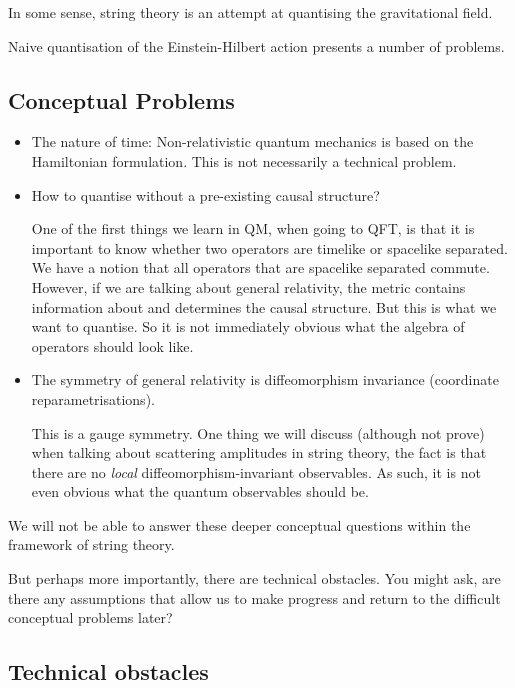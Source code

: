 In some sense, string theory is an attempt at quantising the gravitational field.

Naive quantisation of the Einstein-Hilbert action presents a number of problems.

\subsection*{Conceptual Problems}%

\begin{itemize}
  \item The nature of time: Non-relativistic quantum mechanics is based on the Hamiltonian formulation.
    This is not necessarily a technical problem.

  \item How to quantise without a pre-existing causal structure?

    One of the first things we learn in QM, when going to QFT, is that it is important to know whether two operators are timelike or spacelike separated. 
    We have a notion that all operators that are spacelike separated commute.
    However, if we are talking about general relativity, the metric contains information about and determines the causal structure. But this is what we want to quantise. So it is not immediately obvious what the algebra of operators should look like.

  \item The symmetry of general relativity is diffeomorphism invariance (coordinate reparametrisations).

    This is a gauge symmetry.
    One thing we will discuss (although not prove) when talking about scattering amplitudes in string theory, the fact is that there are  no \emph{local} diffeomorphism-invariant observables.
    As such, it is not even obvious what the quantum observables should be.
\end{itemize}

We will not be able to answer these deeper conceptual questions within the framework of string theory.

But perhaps more importantly, there are technical obstacles.
You might ask, are there any assumptions that allow us to make progress and return to the difficult conceptual problems later?

\subsection*{Technical obstacles}%

